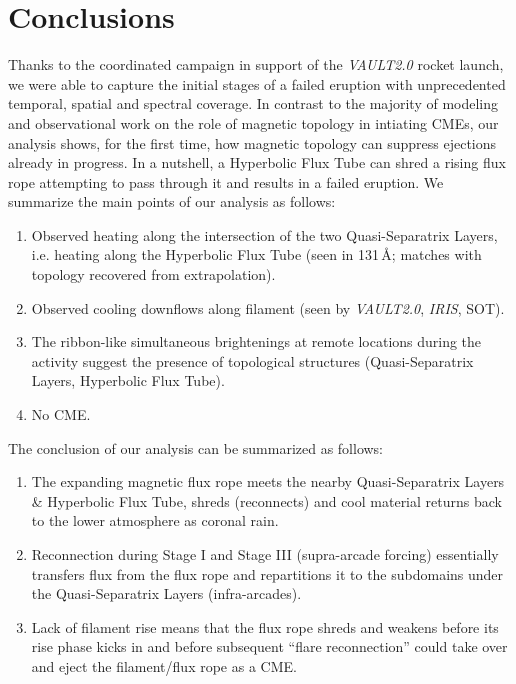 \documentclass[preprint]{aastex}
\begin{document}
\section{Conclusions}

Thanks to the coordinated campaign in support of the \textit{VAULT2.0} rocket launch, we were able to capture the initial stages of a failed eruption with unprecedented temporal, spatial and spectral coverage. In contrast to the majority of modeling and observational work on the role of magnetic topology in intiating CMEs, our analysis shows, for the first time, how magnetic topology can suppress ejections already in progress. In a nutshell, a Hyperbolic Flux Tube can shred a rising flux rope attempting to pass through it and results in a failed eruption. We summarize the main points of our analysis as follows:

\begin{enumerate}
\item Observed heating along the intersection of the two Quasi-Separatrix Layers, i.e. heating along the Hyperbolic Flux Tube (seen in 131\,\AA; matches with topology recovered from extrapolation). 

\item Observed cooling downflows along filament (seen by \textit{VAULT2.0}, \textit{IRIS}, SOT). 

\item The ribbon-like simultaneous brightenings at remote locations during the activity suggest the presence of topological structures (Quasi-Separatrix Layers, Hyperbolic Flux Tube).

\item No CME.

\end{enumerate}

The conclusion of our analysis can be summarized as follows: 

\begin{enumerate}
\item The expanding magnetic flux rope meets the nearby Quasi-Separatrix Layers \& Hyperbolic Flux Tube, shreds (reconnects) and cool material returns back to the lower atmosphere as coronal rain.

\item Reconnection during Stage I and Stage III (supra-arcade forcing) essentially transfers flux from the flux rope and repartitions it to the subdomains under the Quasi-Separatrix Layers (infra-arcades).

\item Lack of filament rise means that the flux rope shreds and weakens before its rise phase kicks in and before subsequent ``flare reconnection'' could take over and eject the filament/flux rope as a CME.

\end{enumerate}
\end{document}
